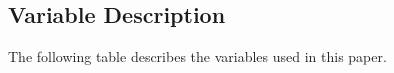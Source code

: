 \documentclass{article}
\begin{document}
\clearpage
\begin{appendices} \doublespacing
    \section{Variable Description} \label{app:vardef}

    The following table describes the variables used in this paper.


\end{appendices}

















\end{document}
